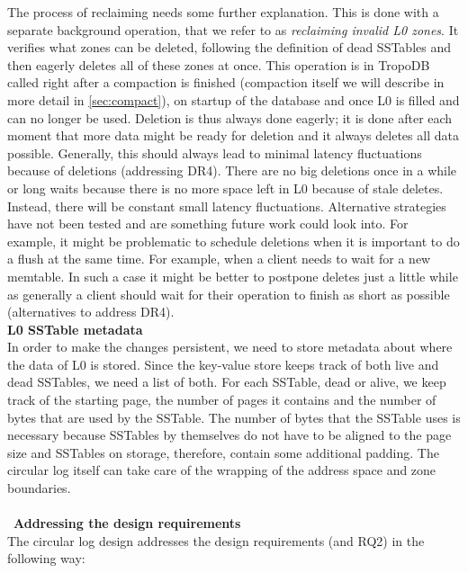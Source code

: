 The process of reclaiming needs some further explanation. This is done with a separate background operation, that we refer to as \textit{reclaiming invalid L0 zones}. It verifies what zones can be deleted, following the definition of dead SSTables and then eagerly deletes all of these zones at once.  This operation is in TropoDB called right after a compaction is finished (compaction itself we will describe in more detail in \autoref{sec:compact}), on startup of the database and once L0 is filled and can no longer be used. Deletion is thus always done eagerly; it is done after each moment that more data might be ready for deletion and it always deletes all data possible. Generally, this should always lead to minimal latency fluctuations because of deletions (addressing DR4). There are no big deletions once in a while or long waits because there is no more space left in L0 because of stale deletes. Instead, there will be constant small latency fluctuations. Alternative strategies have not been tested and are something future work could look into. For example, it might be problematic to schedule deletions when it is important to do a flush at the same time. For example, when a client needs to wait for a new memtable. In such a case it might be better to postpone deletes just a little while as generally a client should wait for their operation to finish as short as possible (alternatives to address DR4).\\
\textbf{L0 SSTable metadata}\\
In order to make the changes persistent, we need to store metadata about where the data of L0 is stored. Since the key-value store keeps track of both live and dead SSTables, we need a list of both. For each SSTable, dead or alive, we keep track of the starting page, the number of pages it contains and the number of bytes that are used by the SSTable. The number of bytes that the SSTable uses is necessary because SSTables by themselves do not have to be aligned to the page size and SSTables on storage, therefore, contain some additional padding. The circular log itself can take care of the wrapping of the address space and zone boundaries.\\\\\
\textbf{Addressing the design requirements}\\
The circular log design addresses the design requirements (and RQ2) in the following way:
